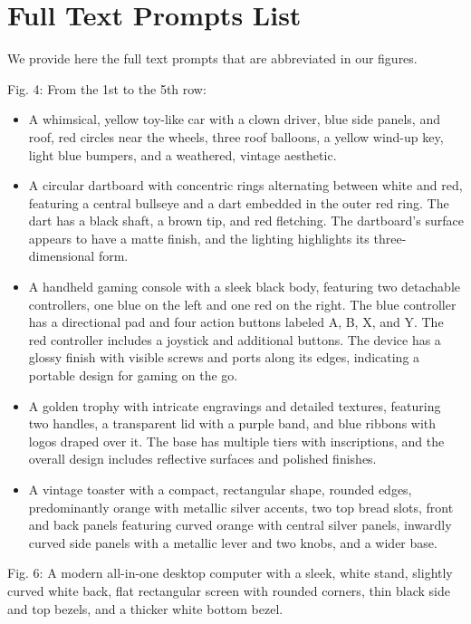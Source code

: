 \section{Full Text Prompts List}
\label{sec:full_cap}
We provide here the full text prompts that are abbreviated in our figures.

\noindent Fig. 4: From the 1st to the 5th row:
\begin{itemize}
    \item A whimsical, yellow toy-like car with a clown driver, blue side panels, and roof, red circles near the wheels, three roof balloons, a yellow wind-up key, light blue bumpers, and a weathered, vintage aesthetic.
    \item A circular dartboard with concentric rings alternating between white and red, featuring a central bullseye and a dart embedded in the outer red ring. The dart has a black shaft, a brown tip, and red fletching. The dartboard's surface appears to have a matte finish, and the lighting highlights its three-dimensional form.
    \item A handheld gaming console with a sleek black body, featuring two detachable controllers, one blue on the left and one red on the right. The blue controller has a directional pad and four action buttons labeled A, B, X, and Y. The red controller includes a joystick and additional buttons. The device has a glossy finish with visible screws and ports along its edges, indicating a portable design for gaming on the go.
    \item A golden trophy with intricate engravings and detailed textures, featuring two handles, a transparent lid with a purple band, and blue ribbons with logos draped over it. The base has multiple tiers with inscriptions, and the overall design includes reflective surfaces and polished finishes.
    \item A vintage toaster with a compact, rectangular shape, rounded edges, predominantly orange with metallic silver accents, two top bread slots, front and back panels featuring curved orange with central silver panels, inwardly curved side panels with a metallic lever and two knobs, and a wider base.
\end{itemize}

\noindent Fig. 6: A modern all-in-one desktop computer with a sleek, white stand, slightly curved white back, flat rectangular screen with rounded corners, thin black side and top bezels, and a thicker white bottom bezel.

